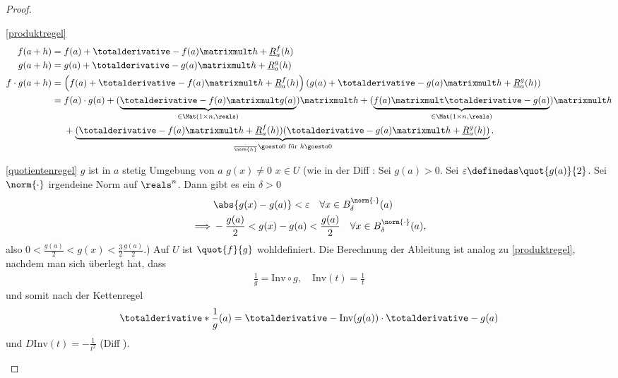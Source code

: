 \begin{proof}
    \begin{proofdescription}
        \item[\ref{produktregel}]
        \begin{align*}
            f(a+h)&=f(a)+\totalderivative-{f}(a)\matrixmult h+\underline{R}_{a}^f(h)\\
            g(a+h)&=g(a)+\totalderivative-{g}(a)\matrixmult h+\underline{R}_{a}^g(h)\\
            f\cdot g(a+h)&\begin{aligned}[t]
                &=\left( f(a)+\totalderivative-{f}(a)\matrixmult h+\underline{R}_{a}^f(h) \right)\left( g(a)+\totalderivative-{g}(a)\matrixmult h+\underline{R}_{a}^g(h) \right)\\
                &=\begin{aligned}[t]
                    &f(a)\cdot g(a)+(\underbrace{\totalderivative-{f}(a)\matrixmult g(a)}_{\in \Mat(1\times n,\reals)})\matrixmult h+(\underbrace{f(a)\matrixmult \totalderivative-{g}(a)}_{\in \Mat(1\times n,\reals)})\matrixmult h\\
                    &+\underbrace{(\totalderivative-{f}(a)\matrixmult h+\underline{R}_a^f(h))(\totalderivative-{g}(a)\matrixmult h+\underline{R}_a^g(h))}_{\frac{\cdot}{\norm{h}}\goesto 0 \text{ für }h\goesto 0}.
                \end{aligned}
            \end{aligned}            
        \end{align*}
        \item[\ref{quotientenregel}] \( g \) ist in \( a \) stetig \timplies \texists Umgebung von \( a \) \sd \( g(x)\neq 0 \) \tforall \( x\in U \) (wie in der Diff : Sei \obda \( g(a)>0 \). Sei \( \varepsilon\definedas \quot{g(a)}{2} \). Sei \( \norm{\cdot} \) irgendeine Norm auf \( \reals^n \). Dann gibt es ein \( \delta>0 \) \sd
        \begin{align*}
            &\abs{g(x)-g(a)}<\varepsilon\quad \forall x\in B_{\delta}^{\norm{\cdot}}(a)\\
            \implies &-\frac{g(a)}{2}<g(x)-g(a)<\frac{g(a)}{2}\quad \forall x\in B_{\delta}^{\norm{\cdot}}(a),
        \end{align*}
        also \( 0<\frac{g(a)}{2}<g(x)<\frac{3}{2}\frac{g(a)}{2} \).) \timplies Auf \( U \) ist \( \quot{f}{g} \) wohldefiniert. Die Berechnung der Ableitung ist analog zu \ref{produktregel}, nachdem man sich überlegt hat, dass
        \begin{align*}
            \frac{1}{g}=\text{Inv}\circ g,\quad \text{Inv}(t)=\frac{1}{t}
        \end{align*}
        und somit nach der Kettenregel
        \begin{align*}
            \totalderivative*{\frac{1}{g}}(a)=\totalderivative-{\text{Inv}(g(a))}\cdot \totalderivative-{g}(a)
        \end{align*}
        und \( D \text{Inv}(t)=-\frac{1}{t^2} \) (Diff ).
    \end{proofdescription}    
\end{proof}
